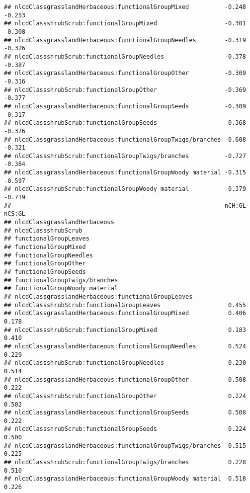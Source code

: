 \documentclass[]{article}
\begin{document}
\begin{verbatim}
## nlcdClassgrasslandHerbaceous:functionalGroupMixed          -0.248 -0.253
## nlcdClassshrubScrub:functionalGroupMixed                   -0.301 -0.308
## nlcdClassgrasslandHerbaceous:functionalGroupNeedles        -0.319 -0.326
## nlcdClassshrubScrub:functionalGroupNeedles                 -0.378 -0.387
## nlcdClassgrasslandHerbaceous:functionalGroupOther          -0.309 -0.316
## nlcdClassshrubScrub:functionalGroupOther                   -0.369 -0.377
## nlcdClassgrasslandHerbaceous:functionalGroupSeeds          -0.309 -0.317
## nlcdClassshrubScrub:functionalGroupSeeds                   -0.368 -0.376
## nlcdClassgrasslandHerbaceous:functionalGroupTwigs/branches -0.608 -0.321
## nlcdClassshrubScrub:functionalGroupTwigs/branches          -0.727 -0.384
## nlcdClassgrasslandHerbaceous:functionalGroupWoody material -0.315 -0.597
## nlcdClassshrubScrub:functionalGroupWoody material          -0.379 -0.719
##                                                            nCH:GL nCS:GL
## nlcdClassgrasslandHerbaceous                                            
## nlcdClassshrubScrub                                                     
## functionalGroupLeaves                                                   
## functionalGroupMixed                                                    
## functionalGroupNeedles                                                  
## functionalGroupOther                                                    
## functionalGroupSeeds                                                    
## functionalGroupTwigs/branches                                           
## functionalGroupWoody material                                           
## nlcdClassgrasslandHerbaceous:functionalGroupLeaves                      
## nlcdClassshrubScrub:functionalGroupLeaves                   0.455       
## nlcdClassgrasslandHerbaceous:functionalGroupMixed           0.406  0.178
## nlcdClassshrubScrub:functionalGroupMixed                    0.183  0.410
## nlcdClassgrasslandHerbaceous:functionalGroupNeedles         0.524  0.229
## nlcdClassshrubScrub:functionalGroupNeedles                  0.230  0.514
## nlcdClassgrasslandHerbaceous:functionalGroupOther           0.508  0.222
## nlcdClassshrubScrub:functionalGroupOther                    0.224  0.502
## nlcdClassgrasslandHerbaceous:functionalGroupSeeds           0.508  0.222
## nlcdClassshrubScrub:functionalGroupSeeds                    0.224  0.500
## nlcdClassgrasslandHerbaceous:functionalGroupTwigs/branches  0.515  0.225
## nlcdClassshrubScrub:functionalGroupTwigs/branches           0.228  0.510
## nlcdClassgrasslandHerbaceous:functionalGroupWoody material  0.518  0.226

\end{verbatim}
\end{document}
